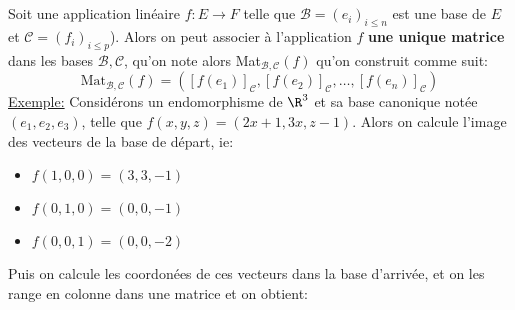 \subsection*{}

Soit une application linéaire \( f : E \rightarrow F \) telle que \(\mathscr{B} = (e_i)_{i \leq n}\) est une base de \( E \) et \(\mathscr{C}=(f_i)_{i \leq p}\)). Alors on peut associer à l'application \(f\) \textbf{une unique matrice} dans les bases \(\mathscr{B, C}\), qu'on note alors Mat\(_{\mathscr{B, C}}(f)\) qu'on construit comme suit:
\[ 
   \text{Mat}_{\mathscr{B, C}}(f) = \left([f(e_1)]_{\mathscr{C}}, [f(e_2)]_{\mathscr{C}}, \ldots, [f(e_n)]_{\mathscr{C}}\right)
\]
\underline{Exemple:} Considérons un endomorphisme de \(\R^3\) et sa base canonique notée \((e_1, e_2, e_3)\), telle que \(f(x, y, z) = (2x+1, 3x, z-1)\). Alors on calcule l'image des vecteurs de la base de départ, ie:
\begin{multicols}{3}
\begin{itemize}
   \item \(f(1, 0, 0) = (3, 3, -1)\)
   \item \(f(0, 1, 0) = (0, 0, -1)\)
   \item \(f(0, 0, 1) = (0, 0, -2)\)
\end{itemize}
\end{multicols}
Puis on calcule les coordonées de ces vecteurs dans la base d'arrivée, et on les range en colonne dans une matrice et on obtient:
